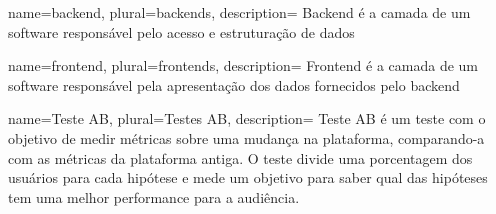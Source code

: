 {
  name=backend,
  plural=backends,
  description={
    Backend é a camada de um software responsável pelo acesso e estruturação de dados
  }
}

{
  name=frontend,
  plural=frontends,
  description={
    Frontend é a camada de um software responsável pela apresentação dos dados fornecidos pelo \gls{backend}
  }
}

{
  name=Teste AB,
  plural=Testes AB,
  description={
    Teste AB é um teste com o objetivo de medir métricas sobre uma mudança na plataforma, comparando-a com as métricas da plataforma antiga. O teste divide uma porcentagem dos usuários para cada hipótese e mede um objetivo para saber qual das hipóteses tem uma melhor performance para a audiência.
  }
}
